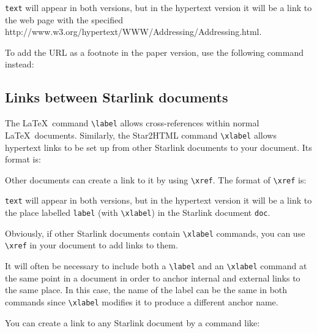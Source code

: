 \documentclass[twoside,11pt,nolof]{starlink}
\begin{document}
\texttt{text} will appear in both versions, but in the hypertext version it
will be a link to the web page with the specified
{http://www.w3.org/hypertext/WWW/Addressing/Addressing.html}.

To add the URL as a footnote in the paper version, use the following command
instead:

\begin{terminalv}
\end{terminalv}

\subsection{Links between Starlink documents}

The \LaTeX\ command \verb#\label# allows cross-references within normal
\LaTeX\ documents.
Similarly, the Star2HTML command \verb#\xlabel# allows hypertext links to be
set up from other Starlink documents to your document.
Its format is:

\begin{terminalv}
\end{terminalv}

Other documents can create a link to it by using \verb+\xref+.
The format of \verb+\xref+ is:

\begin{terminalv}
\end{terminalv}

\texttt{text} will appear in both versions, but in the hypertext version it
will be a link to the place labelled \texttt{label} (with \verb+\xlabel+) in
the Starlink document \texttt{doc}.

Obviously, if other Starlink documents contain \verb+\xlabel+ commands, you
can use \verb+\xref+ in your document to add links to them.

It will often be necessary to include both a \verb#\label# and an
\verb#\xlabel# command at the same point in a document in order to anchor
internal and external links to the same place.
In this case, the name of the label can be the same in both commands since
\verb#\xlabel# modifies it to produce a different anchor name.

You can create a link to any Starlink document by a command like:

\begin{terminalv}
\end{terminalv}
\end{document}
